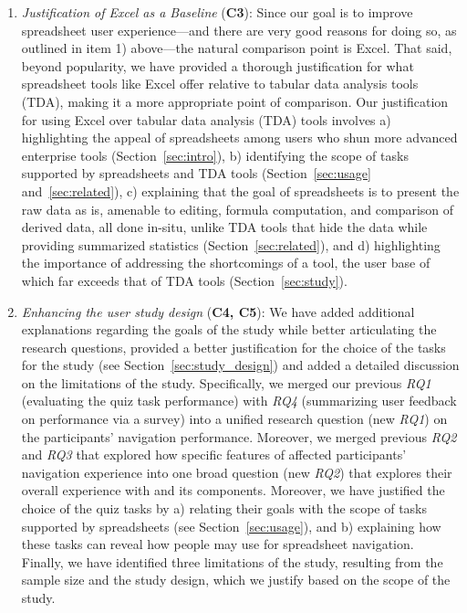 \begin{enumerate}
\item \textit{Justification of Excel as a Baseline} (\textbf{C3}):
Since our goal is to improve spreadsheet
user experience---and there are very good reasons for doing so,
as outlined in item 1) above---the natural comparison point
is Excel. 
That said, beyond popularity, 
we have provided a thorough justification
for what spreadsheet tools like Excel offer
relative to tabular data analysis tools (TDA),
making it a more appropriate point of comparison.
Our justification for using Excel over 
tabular data analysis (TDA) tools involves 
a) highlighting the appeal of spreadsheets 
among users who shun more advanced enterprise 
tools (Section~\ref{sec:intro}), 
b) identifying the scope of tasks 
supported by spreadsheets and 
TDA tools (Section~\ref{sec:usage} and~\ref{sec:related}), 
c) explaining that the goal of spreadsheets 
is to present the raw data as is, 
amenable to editing, formula computation, 
and comparison of derived data, all done in-situ,
unlike TDA tools that hide the data 
while providing summarized statistics 
(Section~\ref{sec:related}), and 
d) highlighting the importance of 
addressing the shortcomings of a tool, 
the user base of which far exceeds 
that of TDA tools (Section~\ref{sec:study}). 


\item \textit{Enhancing the user study design} 
(\textbf{C4, C5}):
We have added additional 
explanations regarding the goals 
of the study while better articulating 
the research questions, 
provided a better justification 
for the choice of the tasks for the study (see Section~\ref{sec:study_design}) 
and added a detailed discussion on the limitations of the study. 
Specifically, we merged our previous \emph{RQ1} (evaluating the quiz task performance) 
with \emph{RQ4} (summarizing user feedback on performance via a survey) 
into a unified research question (new \emph{RQ1}) 
on the participants' navigation performance. 
Moreover, we merged previous \emph{RQ2} and \emph{RQ3} 
that explored how specific features of \noah 
affected participants' navigation experience 
into one broad question (new \emph{RQ2}) 
that explores their overall experience with \noah and its components. 
Moreover, we have justified the choice of the quiz tasks by 
a) relating their goals with the scope of tasks supported by spreadsheets (see Section~\ref{sec:usage}), 
and b) explaining how these tasks can reveal how people may use \noah 
for spreadsheet navigation. 
Finally, we have identified three limitations of the study, 
resulting from the sample size and the study design, which we justify based on the scope of the study.


\end{enumerate}

